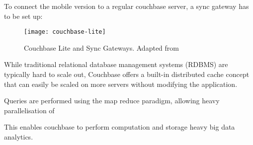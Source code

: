 To connect the mobile version to a regular couchbase server, a sync gateway has to be set up:

\begin{figure}[H]
\centering
\texttt{[image: couchbase-lite]}
\caption{Couchbase Lite and Sync Gateways. Adapted from \cite{couchbase-lite}}
\end{figure}

While traditional relational database management systems (RDBMS) are typically hard to scale out, Couchbase offers a built-in distributed cache concept that can easily be scaled on more servers without modifying the application.

Queries are performed using the map reduce paradigm, allowing heavy parallelisation of 

This enables couchbase to perform computation and storage heavy big data analytics. 